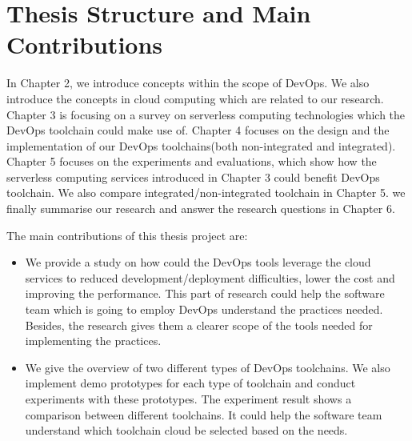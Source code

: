 \section{Thesis Structure and Main Contributions}
In Chapter 2, we introduce concepts within the scope of DevOps. We also introduce the concepts in cloud computing which are related to our research. Chapter 3 is focusing on a survey on serverless computing technologies which the DevOps toolchain could make use of. Chapter 4 focuses on the design and the implementation of our DevOps toolchains(both non-integrated and integrated). Chapter 5 focuses on the experiments and evaluations, which show how the serverless computing services introduced in Chapter 3 could benefit DevOps toolchain. We also compare integrated/non-integrated toolchain in Chapter 5. we finally summarise our research and answer the research questions in Chapter 6.
\par
The main contributions of this thesis project are:
\begin{itemize}
    \item We provide a study on how could the DevOps tools leverage the cloud services to reduced development/deployment difficulties, lower the cost and improving the performance. This part of research could help the software team which is going to employ DevOps understand the practices needed. Besides, the research gives them a clearer scope of the tools needed for implementing the practices.
    \item We give the overview of two different types of DevOps toolchains. We also implement demo prototypes for each type of toolchain and conduct experiments with these prototypes. The experiment result shows a comparison between different toolchains. It could help the software team understand which toolchain cloud be selected based on the needs.
\end{itemize}